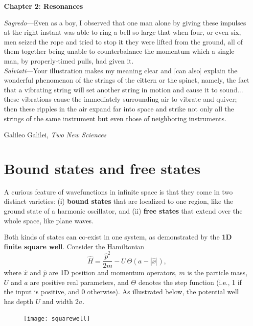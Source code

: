 \documentclass[pra,12pt]{revtex4}
\begin{document}
\setcounter{page}{20}

\setlength{\epigraphwidth}{0.7\textwidth}

\begin{center}
{\Large \textbf{Chapter 2: Resonances}}
\end{center}

\epigraph{
\textit{Sagredo}---Even as a boy, I observed that one man alone by giving these impulses at the right instant was able to ring a bell so large that when four, or even six, men seized the rope and tried to stop it they were lifted from the ground, all of them together being unable to counterbalance the momentum which a single man, by properly-timed pulls, had given it. \\ \vskip0.1in
\textit{Salviati}---Your illustration makes my meaning clear and [can also] explain the wonderful phenomenon of the strings of the cittern or the spinet, namely, the fact that a vibrating string will set another string in motion and cause it to sound... these vibrations cause the immediately surrounding air to vibrate and quiver; then these ripples in the air expand far into space and strike not only all the strings of the same instrument but even those of neighboring instruments.}{Galileo Galilei, \textit{Two New Sciences}}

\section{Bound states and free states}

A curious feature of wavefunctions in infinite space is that they come
in two distinct varieties: (i) \textbf{bound states} that are
localized to one region, like the ground state of a harmonic
oscillator, and (ii) \textbf{free states} that extend over the whole
space, like plane waves.

Both kinds of states can co-exist in one system, as demonstrated by
the \textbf{1D finite square well}.  Consider the Hamiltonian
\begin{equation}
  \hat{H} = \frac{\hat{p}^2}{2m} - U \,\Theta(a -|\hat{x}|),
\end{equation}
where $\hat{x}$ and $\hat{p}$ are 1D position and momentum operators,
$m$ is the particle mass, $U$ and $a$ are positive real parameters,
and $\Theta$ denotes the step function (i.e., 1 if the input is
positive, and 0 otherwise).  As illustrated below, the potential well
has depth $U$ and width $2a$.

\begin{figure}[h]
  \centering\texttt{[image: squarewell]}
\end{figure}
\end{document}
